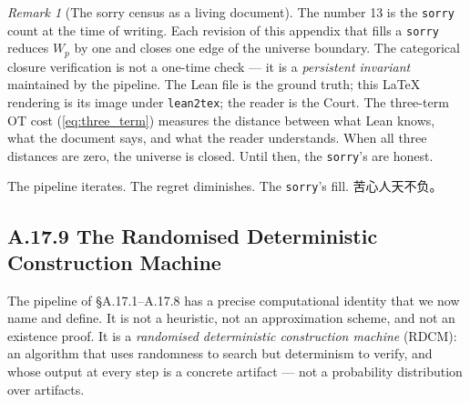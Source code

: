 \documentclass[11pt,a4paper]{article}
\theoremstyle{definition}
\theoremstyle{remark}
\newtheorem{remark}[theorem]{Remark}
\begin{document}
\begin{remark}[The sorry census as a living document]
The number 13 is the \texttt{sorry} count at the time of writing. Each revision of this appendix that fills a \texttt{sorry} reduces $W_p$ by one and closes one edge of the universe boundary. The categorical closure verification is not a one-time check --- it is a \emph{persistent invariant} maintained by the pipeline. The Lean file is the ground truth; this \LaTeX{} rendering is its image under \texttt{lean2tex}; the reader is the Court. The three-term OT cost (\ref{eq:three_term}) measures the distance between what Lean knows, what the document says, and what the reader understands. When all three distances are zero, the universe is closed. Until then, the \texttt{sorry}'s are honest.
\end{remark}

The pipeline iterates. The regret diminishes. The \texttt{sorry}'s fill. 苦心人天不负。


\subsection{A.17.9 The Randomised Deterministic Construction Machine}

The pipeline of \S A.17.1--A.17.8 has a precise computational identity that we now name and define. It is not a heuristic, not an approximation scheme, and not an existence proof. It is a \emph{randomised deterministic construction machine} (RDCM): an algorithm that uses randomness to search but determinism to verify, and whose output at every step is a concrete artifact --- not a probability distribution over artifacts.
\end{document}
